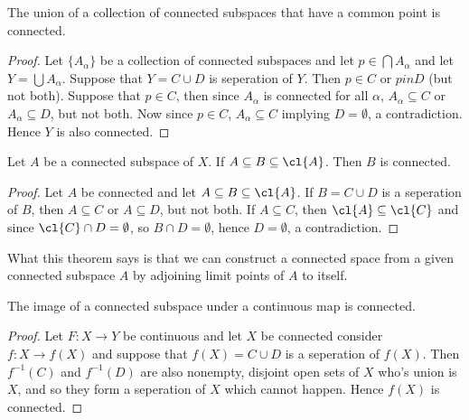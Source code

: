 \begin{theorem}\label{3.1.4}
    The union of a collection of connected subspaces that have a common point is connected.
\end{theorem}
\begin{proof}
    Let $\{A_{\alpha}\}$ be a collection of connected subspaces and let $p \in \bigcap{A_{\alpha}}$
    and let $Y=\bigcup{A_{\alpha}}$. Suppose that $Y=C \cup D$ is seperation of  $Y$. Then  $p \in
    C$ or  $p in D$  (but not both). Suppose that $p \in C$, then since $A_{\alpha}$ is connected
    for all $\alpha$,  $A_{\alpha} \subseteq C$ or $A_{\alpha} \subseteq D$, but not both. Now since
    $p \in C$,  $A_{\alpha} \subseteq C$ implying $D=\emptyset$, a contradiction. Hence  $Y$ is also
    connected.
\end{proof}

\begin{theorem}\label{3.1.5}
    Let $A$ be a connected subspace of  $X$. If  $A \subseteq B \subseteq \cl{A}$.
    Then $B$ is connected.
\end{theorem}
\begin{proof}
    Let $A$ be connected and let  $A \subseteq B \subseteq \cl{A}$. If $B=C \cup D$ is a seperation
    of  $B$, then  $A \subseteq C$ or  $A \subseteq D$, but not both. If  $A \subseteq C$, then
    $\cl{A} \subseteq \cl{C}$ and since $\cl{C} \cap D=\emptyset$, so $B \cap D=\emptyset$, hence
    $D=\emptyset$, a contradiction.
\end{proof}
\begin{remark}
    What this theorem says is that we can construct a connected space from a given connected
    subspace $A$ by adjoining limit points of $A$ to itself.
\end{remark}

\begin{theorem}\label{3.1.6}
    The image of a connected subspace under a continuous map is connected.
\end{theorem}
\begin{proof}
    Let $F:X \rightarrow Y$ be continuous and let $X$ be connected consider
    $f:X \rightarrow f(X)$ and suppose that $f(X)=C \cup D$ is a seperation of $f(X)$. Then
    $f^{-1}(C)$ and $f^{-1}(D)$ are also nonempty, disjoint open sets of $X$ who's union is  $X$,
    and so they form a seperation of  $X$ which cannot happen. Hence  $f(X)$ is connected.
\end{proof}


